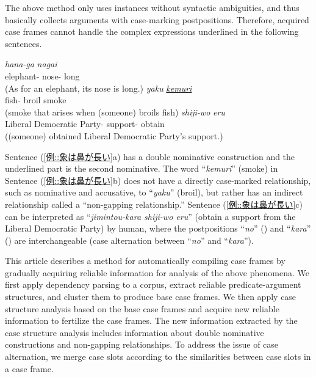 \documentclass[english]{jnlp_1.4_rep}
\newcommand{\nom}{}
\newcommand{\acc}{}
\newcommand{\abl}{}
\newcommand{\gen}{}
\newcommand{\TOP}{}
\begin{document}
The above method only uses instances without syntactic ambiguities, and
thus basically 
\linebreak
collects arguments with case-marking
postpositions. Therefore, acquired case frames cannot handle the
complex expressions underlined in the following sentences.
\begin{exe}
\ex \label{例::象は鼻が長い}
 \begin{xlist}
 \ex
   {\textit{hana-ga}} {\textit{nagai}} \\
       {elephant-\TOP} {nose-\nom} {long} \\
  \trans (As for an elephant, its nose is long.)
 \ex
   {\textit{yaku}} {\textit{\underline{kemuri}}} \\
       {fish-\acc} {broil} {smoke} \\
  \trans (smoke that arises when (someone) broils fish)
 \ex
   {\textit{shiji-wo}} {\textit{eru}} \\
       {Liberal Democratic Party-\gen} {support-\acc} {obtain} \\
  \trans ((someone) obtained Liberal Democratic Party's support.)
 \end{xlist}
\end{exe}
Sentence (\ref{例::象は鼻が長い}a) has a double nominative
construction and the underlined part is the second nominative. The word
``\textit{kemuri}'' (smoke) in Sentence (\ref{例::象は鼻が長い}b) does
not have a directly case-marked relationship, such as nominative and
accusative, to ``\textit{yaku}'' (broil), but rather has an
indirect relationship called a ``non-gapping relationship.'' Sentence (\ref{例::象は鼻が長い}c)
can be interpreted as ``\textit{jimintou-kara shiji-wo eru}'' (obtain a support from
the Liberal Democratic Party) by human, where the postpositions
``\textit{no}'' (\gen) and ``\textit{kara}'' (\abl) are
interchangeable (case alternation between ``\textit{no}'' and
``\textit{kara}'').

This article describes a method for automatically compiling case frames by
gradually acquiring reliable information for analysis of the
above phenomena. We first apply dependency parsing to a corpus, extract
reliable predicate-argument structures, and cluster them to produce
base case frames. We then apply case structure analysis based on the
base case frames and acquire new reliable information to fertilize
the case frames. The new information extracted by the case structure
analysis includes information about double nominative constructions
and non-gapping relationships. To address the issue of case alternation,
we merge case slots according to the similarities between case slots in
a case frame.
\end{document}
